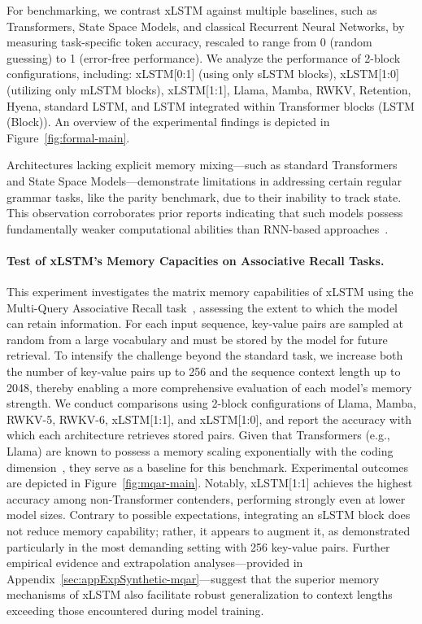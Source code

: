 For benchmarking, we contrast xLSTM against multiple baselines, such as Transformers, State Space Models, and classical Recurrent Neural Networks, by measuring task-specific token accuracy, rescaled to range from 0 (random guessing) to 1 (error-free performance). We analyze the performance of 2-block configurations, including: xLSTM[0:1] (using only sLSTM blocks), xLSTM[1:0] (utilizing only mLSTM blocks), xLSTM[1:1], Llama, Mamba, RWKV, Retention, Hyena, standard LSTM, and LSTM integrated within Transformer blocks (LSTM (Block)). An overview of the experimental findings is depicted in Figure~\ref{fig:formal-main}.

Architectures lacking explicit memory mixing—such as standard Transformers and State Space Models—demonstrate limitations in addressing certain regular grammar tasks, like the parity benchmark, due to their inability to track state. This observation corroborates prior reports indicating that such models possess fundamentally weaker computational abilities than RNN-based approaches~\citep{Merrill:24, Merrill:23, Deletang:23}.

\paragraph{Test of xLSTM's Memory Capacities on Associative Recall Tasks.} This experiment investigates the matrix memory capabilities of xLSTM using the Multi-Query Associative Recall task~\citep{Arora:23arxiv}, assessing the extent to which the model can retain information. For each input sequence, key-value pairs are sampled at random from a large vocabulary and must be stored by the model for future retrieval. To intensify the challenge beyond the standard task, we increase both the number of key-value pairs up to 256 and the sequence context length up to 2048, thereby enabling a more comprehensive evaluation of each model’s memory strength. We conduct comparisons using 2-block configurations of Llama, Mamba, RWKV-5, RWKV-6, xLSTM[1:1], and xLSTM[1:0], and report the accuracy with which each architecture retrieves stored pairs. Given that Transformers (e.g., Llama) are known to possess a memory scaling exponentially with the coding dimension~\citep{Ramsauer:21}, they serve as a baseline for this benchmark. Experimental outcomes are depicted in Figure~\ref{fig:mqar-main}. Notably, xLSTM[1:1] achieves the highest accuracy among non-Transformer contenders, performing strongly even at lower model sizes. Contrary to possible expectations, integrating an sLSTM block does not reduce memory capability; rather, it appears to augment it, as demonstrated particularly in the most demanding setting with 256 key-value pairs. Further empirical evidence and extrapolation analyses—provided in Appendix~\ref{sec:appExpSynthetic-mqar}—suggest that the superior memory mechanisms of xLSTM also facilitate robust generalization to context lengths exceeding those encountered during model training.

